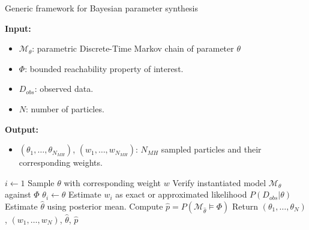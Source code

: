 \begin{algorithm}[H]
    \caption{Generic framework for Bayesian parameter synthesis}
    \label{alg:generic-framework}
    \footnotesize{
        \hspace*{\algorithmicindent} \textbf{Input:}
        \begin{itemize}[noitemsep,topsep=0pt]
            \item $\mathcal{M}_\theta$: parametric Discrete-Time Markov chain of parameter $\theta$
            \item $\Phi$: bounded reachability property of interest.
            \item $D_{obs}$: observed data.
            \item $N$: number of particles.
        \end{itemize}
        \hspace*{\algorithmicindent} \textbf{Output:}
        \begin{itemize}[noitemsep,topsep=0pt]
            \item $(\theta_1,\ldots,\theta_{N_{MH}})$, $(w_1,\ldots,w_{N_{MH}})$: $N_{MH}$ sampled
                  particles and their corresponding weights.
        \end{itemize}
    }
    \begin{algorithmic}[1]
        \State $i \leftarrow 1$
        \State Sample $\theta$ with corresponding weight $w$
        \State Verify instantiated model $\mathcal{M}_\theta$ against $\Phi$
        \State $\theta_i \leftarrow \theta$
        \State Estimate $w_i$ as exact or approximated likelihood $P(D_{obs}|\theta)$
        \EndIf
        \EndWhile
        \State Estimate $\hat{\theta}$ using posterior mean.
        \State Compute $\hat{p}=P(\mathcal{M}_{\hat{\theta}}\models\Phi)$
        \State Return $(\theta_1,\ldots,\theta_{N})$, $(w_1,\ldots,w_{N})$, $\hat{\theta}$, $\hat{p}$
        \EndProcedure
    \end{algorithmic}
\end{algorithm}

